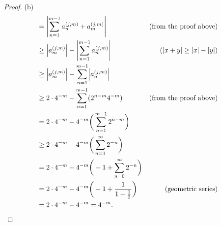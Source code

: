 \begin{proof}{(b)}
\begin{align*}
         & = \abs*{\sum_{n = 1}^{m - 1} a_n^{(j, m)} + a_m^{(j, m)}}                                        & \text{(from the proof above)}           \\
         & \geq \abs*{a_m^{(j, m)}} - \abs*{\sum_{n = 1}^{m - 1} a_n^{(j, m)}}                              & (\abs*{x + y} \geq \abs*{x} - \abs*{y}) \\
         & \geq \abs*{a_m^{(j, m)}} - \sum_{n = 1}^{m - 1} \abs*{a_n^{(j, m)}}                                                                        \\
         & \geq 2 \cdot 4^{-m} - \sum_{n = 1}^{m - 1} (2^{n - m} 4^{-m})                                    & \text{(from the proof above)}           \\
         & = 2 \cdot 4^{-m} - 4^{-m} \bigg(\sum_{n = 1}^{m - 1} 2^{n - m}\bigg)                                                                       \\
         & \geq 2 \cdot 4^{-m} - 4^{-m} \bigg(\sum_{n = 1}^\infty 2^{-n}\bigg)                                                                        \\
         & = 2 \cdot 4^{-m} - 4^{-m} \bigg(-1 + \sum_{n = 0}^\infty 2^{-n}\bigg)                                                                      \\
         & = 2 \cdot 4^{-m} - 4^{-m} \bigg(-1 + \frac{1}{1 - \frac{1}{2}}\bigg)                             & \text{(geometric series)}               \\
         & = 2 \cdot 4^{-m} - 4^{-m} = 4^{-m}.
    \end{align*}
\end{proof}

